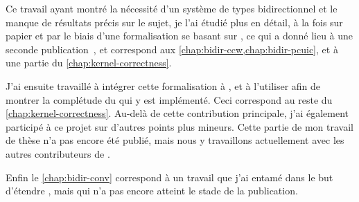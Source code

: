 Ce travail ayant montré la nécessité d’un système de types bidirectionnel
et le manque de résultats précis sur le sujet, je l’ai
étudié plus en détail, à la fois sur papier et par le biais d’une
formalisation se basant sur ,
ce qui a donné lieu à une seconde publication~,
et correspond aux \cref{chap:bidir-ccw,chap:bidir-pcuic}, et à une partie du
\cref{chap:kernel-correctness}.

J’ai ensuite travaillé à intégrer cette formalisation à
, et à l’utiliser afin de montrer la complétude du 
qui y est implémenté. Ceci correspond au reste du \cref{chap:kernel-correctness}.
Au-delà de cette contribution principale,
j’ai également participé à ce projet sur d’autres points plus mineurs.
Cette partie de mon travail de thèse n’a pas encore été publié, mais nous y
travaillons actuellement avec les autres contributeurs de .

Enfin le \cref{chap:bidir-conv} correspond à un travail que j’ai entamé dans
le but d’étendre , mais qui n’a pas encore atteint le stade de la
publication.
